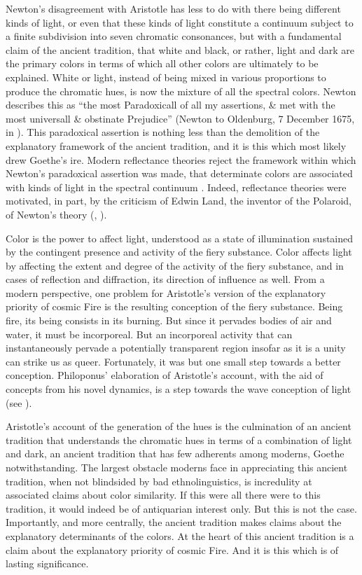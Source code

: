 Newton's disagreement with Aristotle has less to do with there being different kinds of light, or even that these kinds of light constitute a continuum subject to a finite subdivision into seven chromatic consonances, but with a fundamental claim of the ancient tradition, that white and black, or rather, light and dark are the primary colors in terms of which all other colors are ultimately to be explained. White or light, instead of being mixed in various proportions to produce the chromatic hues, is now the mixture of all the spectral colors. Newton describes this as ``the most Paradoxicall of all my assertions, \& met with the most universall \& obstinate Prejudice'' (Newton to Oldenburg, 7 December 1675, in \citealt[385]{Turnbull:1959kx}). This paradoxical assertion is nothing less than the demolition of the explanatory framework of the ancient tradition, and it is this which most likely drew Goethe's ire. Modern reflectance theories reject the framework within which Newton's paradoxical assertion was made, that determinate colors are associated with kinds of light in the spectral continuum \citep{Hilbert:1987jq}. Indeed, reflectance theories were motivated, in part, by the criticism of Edwin Land, the inventor of the Polaroid, of Newton's theory (\citealt{Land:1971aa}, \citealt{Land:1977aa}).

Color is the power to affect light, understood as a state of illumination sustained by the contingent presence and activity of the fiery substance. Color affects light by affecting the extent and degree of the activity of the fiery substance, and in cases of reflection and diffraction, its direction of influence as well. From a modern perspective, one problem for Aristotle's version of the explanatory priority of cosmic Fire is the resulting conception of the fiery substance. Being fire, its being consists in its burning. But since it pervades bodies of air and water, it must be incorporeal. But an incorporeal activity that can instantaneously pervade a potentially transparent region insofar as it is a unity can strike us as queer. Fortunately, it was but one small step towards a better conception. Philoponus' elaboration of Aristotle's account, with the aid of concepts from his novel dynamics, is a step towards the wave conception of light (see \citealt{Wolff:1987vn}).

Aristotle's account of the generation of the hues is the culmination of an ancient tradition that understands the chromatic hues in terms of a combination of light and dark, an ancient tradition that has few adherents among moderns, Goethe notwithstanding. The largest obstacle moderns face in appreciating this ancient tradition, when not blindsided by bad ethnolinguistics, is incredulity at associated claims about color similarity. If this were all there were to this tradition, it would indeed be of antiquarian interest only. But this is not the case. Importantly, and more centrally, the ancient tradition makes claims about the explanatory determinants of the colors. At the heart of this ancient tradition is a claim about the explanatory priority of cosmic Fire. And it is this which is of lasting significance. 


